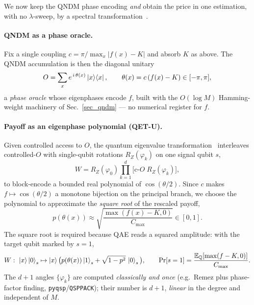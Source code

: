 \documentclass[11pt]{article}
\newcommand{\E}{\mathbb{E}}
\newcommand{\Q}{\mathbb{Q}}
\begin{document}
We now keep the QNDM phase encoding \emph{and} obtain the price in one estimation, with no $\lambda$-sweep, by a spectral transformation~\cite{gilyen2019qsvt,dong2022qetu,martyn2021grand}.

\paragraph{QNDM as a phase oracle.} Fix a single coupling $c=\pi/\max_x|f(x)-K|$ and absorb $K$ as above. The QNDM accumulation is then the diagonal unitary
\begin{equation}\label{eq_oracle}
O=\sum_x e^{\,i\,\theta(x)}\ket{x}\!\bra{x},\qquad \theta(x)=c\,(f(x)-K)\in[-\pi,\pi],
\end{equation}
a \emph{phase oracle} whose eigenphases encode $f$, built with the $O(\log M)$ Hamming-weight machinery of Sec.~\ref{sec_qndm} --- no numerical register for $f$.

\paragraph{Payoff as an eigenphase polynomial (QET-U).} Given controlled access to $O$, the quantum eigenvalue transformation~\cite{dong2022qetu,gilyen2019qsvt} interleaves controlled-$O$ with single-qubit rotations $R_Z(\varphi_k)$ on one signal qubit $s$,
\begin{equation}\label{eq_seq}
W=R_Z(\varphi_0)\prod_{k=1}^{d}\big[\text{c-}O\;R_Z(\varphi_k)\big],
\end{equation}
to block-encode a bounded real polynomial of $\cos(\theta/2)$. Since $c$ makes $f\mapsto\cos(\theta/2)$ a monotone bijection on the principal branch, we choose the polynomial to approximate the \emph{square root} of the rescaled payoff,
\begin{equation}\label{eq_poly}
p(\theta(x))\approx\sqrt{\frac{\max(f(x)-K,0)}{C_{\max}}}\in[0,1].
\end{equation}
The square root is required because QAE reads a squared amplitude: with the target qubit marked by $s=1$,
\begin{equation}\label{eq_amp}
W:\ \ket{x}\ket{0}_s\mapsto\ket{x}\big(p(\theta(x))\ket{1}_s+\sqrt{1-p^2}\,\ket{0}_s\big),
\qquad
\Pr[s=1]=\frac{\E_\Q[\max(f-K,0)]}{C_{\max}}.
\end{equation}
The $d+1$ angles $\{\varphi_k\}$ are computed \emph{classically and once} (e.g.\ Remez plus phase-factor finding, \texttt{pyqsp}/\texttt{QSPPACK}); their number is $d+1$, \emph{linear} in the degree and independent of $M$.
\end{document}
